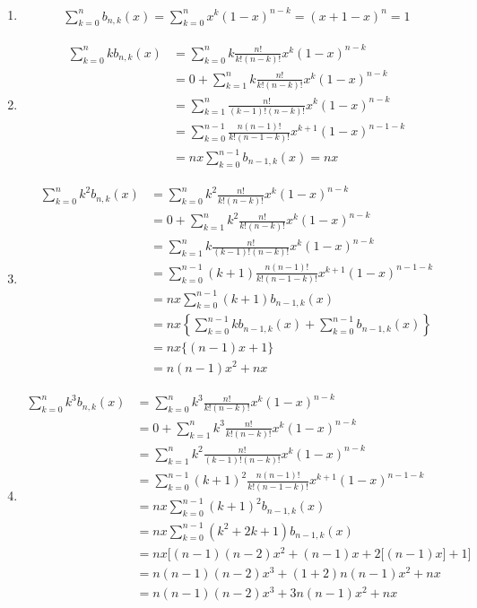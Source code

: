 \begin{enumerate}
	\item 
	\begin{align*}
		\sum_{k=0}^{n} b_{n,k}(x) = \sum_{k=0}^{n} x^k (1-x)^{n-k} = (x+1-x)^n = 1
	\end{align*}
	\item 
	\begin{align*}
		\sum_{k=0}^{n} k b_{n,k}(x) &= \sum_{k=0}^{n} k \frac{n!}{k!(n-k)!} x^k (1-x)^{n-k}\\
		&= 0 + \sum_{k=1}^{n} k \frac{n!}{k!(n-k)!} x^k (1-x)^{n-k}\\
		&= \sum_{k=1}^{n} \frac{n!}{(k-1)!(n-k)!} x^k (1-x)^{n-k}\\
		&= \sum_{k=0}^{n-1} \frac{n (n-1)!}{k! (n-1-k)!} x^{k+1} (1-x)^{n-1-k} \\
		&= nx \sum_{k=0}^{n-1} b_{n-1,k}(x) = nx
	\end{align*}
	\item 
	\begin{align*}
		\sum_{k=0}^{n} k^2 b_{n,k}(x) &= \sum_{k=0}^{n} k^2 \frac{n!}{k!(n-k)!} x^k(1-x)^{n-k}\\
		&= 0 + \sum_{k=1}^{n}  k^2 \frac{n!}{k!(n-k)!} x^k(1-x)^{n-k}\\
		&= \sum_{k=1}^{n} k \frac{n!}{(k-1)!(n-k)!} x^k (1-x)^{n-k}\\
		&= \sum_{k=0}^{n-1} (k+1) \frac{n(n-1)!}{k!(n-1-k)!} x^{k+1} (1-x)^{n-1-k}\\
		&= nx \sum_{k=0}^{n-1} (k+1) b_{n-1,k}(x)\\
		&= nx \left\{\sum_{k=0}^{n-1}kb_{n-1,k}(x) + \sum_{k=0}^{n-1} b_{n-1,k}(x)\right\}\\
		&= nx \Big\{(n-1)x+1\Big\}\\
		&= n(n-1)x^2 + nx
	\end{align*}
	\item 
	\begin{align*}
		\sum_{k=0}^{n} k^3 b_{n,k}(x) 	 &= \sum_{k=0}^{n}k^3 \frac{n!}{k!(n-k)!} x^k (1-x)^{n-k}\\
		&= 0 + \sum_{k=1}^{n}k^3 \frac{n!}{k!(n-k)!} x^k (1-x)^{n-k}\\
		&= \sum_{k=1}^{n}k^2 \frac{n!}{(k-1)!(n-k)!} x^k (1-x)^{n-k}\\
		&= \sum_{k=0}^{n-1}(k+1)^2 \frac{n(n-1)!}{k!(n-1-k)!} x^{k+1} (1-x)^{n-1-k}\\
		&= nx \sum_{k=0}^{n-1} (k+1)^2 b_{n-1,k}(x)\\
		&= nx \sum_{k=0}^{n-1} (k^2+2k+1) b_{n-1,k}(x)\\
		&= nx \Big[(n-1)(n-2)x^2 + (n-1)x + 2\big[(n-1)x\big] + 1\Big]\\
		&= n(n-1)(n-2)x^3 + (1+2)n(n-1)x^2 + nx\\
		&= n(n-1)(n-2)x^3 + 3n(n-1)x^2 + nx
	\end{align*}
	

\end{enumerate}
